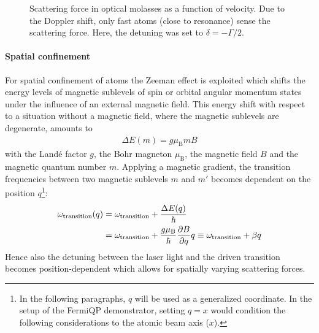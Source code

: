 \begin{figure}
    \caption{Scattering force in optical molasses as a function of velocity. Due to the Doppler shift, only fast atoms (close to resonance) sense the scattering force. Here, the detuning was set to $\delta = -\Gamma/2$.
    }
    \label{fig:optical_molasses_force}
\end{figure}

\paragraph{Spatial confinement} For spatial confinement of atoms the Zeeman effect is exploited which shifts the energy levels of magnetic sublevels of spin or orbital angular momentum states under the influence of an external magnetic field. This energy shift with respect to a situation without a magnetic field, where the magnetic sublevels are degenerate, amounts to
\begin{align}
    \Delta E(m) = g \mu_\text{B} m B
\end{align}
with the Landé factor $g$, the Bohr magneton $\mu_\text{B}$, the magnetic field $B$ and the magnetic quantum number $m$. Applying a magnetic gradient, the transition frequencies between two magnetic sublevels $m$ and $m'$ becomes dependent on the position $q$\footnote{In the following paragraphs, $q$ will be used as a generalized coordinate. In the setup of the FermiQP demonstrator, setting $q = x$ would condition the following considerations to the atomic beam axis ($x$).}:
\begin{equation}
    \begin{split}\label{eq:omega_transition_zeeman}
      \omega_\text{transition}(q) &= \omega_\text{transition} + \frac{\Delta E(q)}{\hbar} \\  
      &= \omega_\text{transition} + \frac{g \mu_\text{B}}{\hbar} \pdv{B}{q} q \equiv \omega_\text{transition} + \beta q
    \end{split}
\end{equation}
Hence also the detuning between the laser light and the driven transition becomes position-dependent which allows for spatially varying scattering forces.

